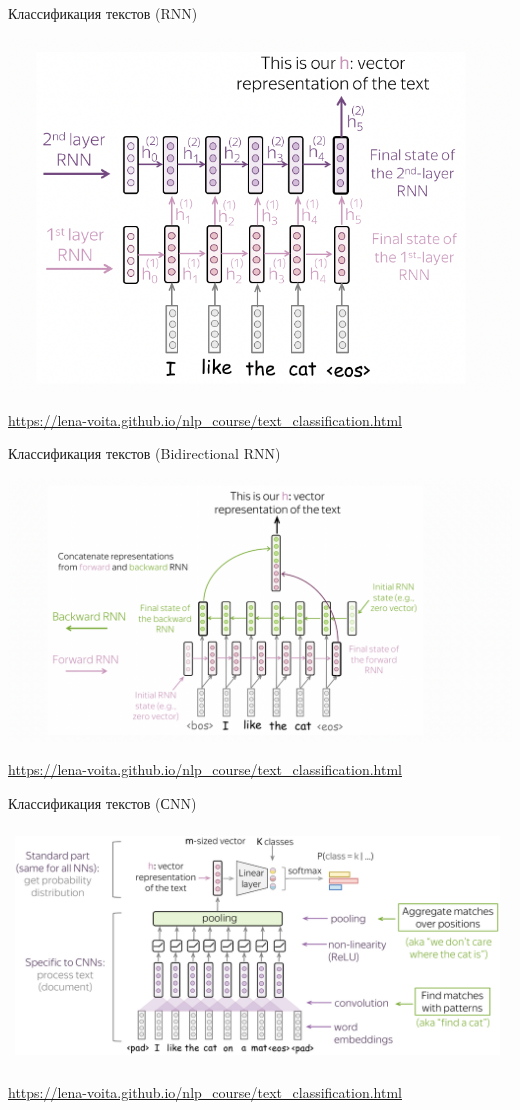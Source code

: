 \documentclass[notes,12pt, aspectratio=169]{beamer}
\begin{document}
\begin{frame}{Классификация текстов (RNN)}
	\begin{center}
		\includegraphics[width=.65\linewidth]{rnn_clf.png}
	\end{center}
	
	\vfill
	\footnotesize  {\color{blue} \url{https://lena-voita.github.io/nlp_course/text_classification.html}} 
\end{frame} 


\begin{frame}{Классификация текстов (Bidirectional RNN)}
	\begin{center}
		\includegraphics[width=.85\linewidth]{bidir_clf.png}
	\end{center}
	
	\vfill
	\footnotesize  {\color{blue} \url{https://lena-voita.github.io/nlp_course/text_classification.html}} 
\end{frame} 


\begin{frame}{Классификация текстов (СNN)}
	\begin{center}
		\includegraphics[width=.85\linewidth]{cnn_clf_t.png}
	\end{center}
	
	\vfill
	\footnotesize  {\color{blue} \url{https://lena-voita.github.io/nlp_course/text_classification.html}} 
\end{frame} 
\end{document}
